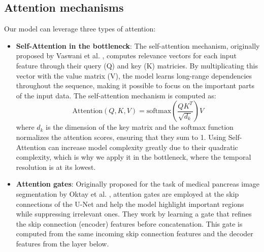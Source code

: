 \subsection*{Attention mechanisms}

Our model can leverage three types of attention:

\begin{itemize}
    \item \textbf{Self-Attention in the bottleneck}: The self-attention mechanism, originally proposed by Vaswani et al. \cite{vaswani2017attention}, computes relevance vectors for each input feature through their query (Q) and key (K) matricies. By multiplicating this vector with the value matrix (V), the model learns long-range dependencies throughout the sequence, making it possible to focus on the important parts of the input data. The self-attention mechanism is computed as:
    \begin{equation}
        \text{Attention}(Q, K, V) = \text{softmax}\left(\frac{QK^T}{\sqrt{d_k}}\right)V
    \end{equation}
    where $d_k$ is the dimension of the key matrix and the softmax function normalizes the attention scores, ensuring that they sum to 1.
    Using Self-Attention can increase model complexity greatly due to their quadratic complexity, which is why we apply it in the bottleneck, where the temporal resolution is at its lowest.
    \item \textbf{Attention gates}: Originally proposed for the task of medical pancreas image segmentation by Oktay et al. \cite{oktay2018attention}, attention gates are employed at the skip connections of the U-Net and help the model highlight important regions while suppressing irrelevant ones. They work by learning a gate that refines the skip connection (encoder) features before concatenation. This gate is computed from the same incoming skip connection features and the decoder features from the layer below.
\end{itemize}

